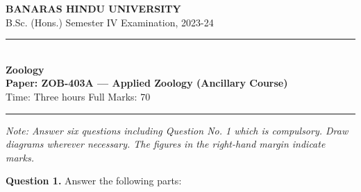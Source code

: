 \documentclass[11pt,a4paper]{article}
\begin{document}
\begin{center}
  {\large\bfseries BANARAS HINDU UNIVERSITY}\\[2pt]
  {\normalsize B.Sc. (Hons.) Semester IV Examination, 2023-24}\\[6pt]
  \rule{0.8\linewidth}{0.5pt}\\[6pt]
  {\large\bfseries Zoology}\\[4pt]
  {\large\bfseries Paper: ZOB-403A --- Applied Zoology (Ancillary Course)}\\[4pt]
  {\normalsize Time: Three hours \hfill Full Marks: 70}
\end{center}

\rule{\linewidth}{0.4pt}

\smallskip



\noindent   \textit{Note: Answer six questions including Question No. 1 which is compulsory. Draw diagrams wherever necessary. The figures in the right-hand margin indicate marks.}

\bigskip




\noindent   \textbf{Question 1.} Answer the following parts:
\end{document}
